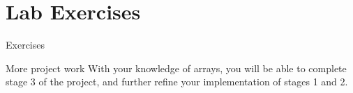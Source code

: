 \documentclass{beamer}
\begin{document}
\section{Lab Exercises}

\begin{frame}{Exercises}
    \begin{block}{More project work}
        With your knowledge of arrays, you will be able to complete stage
        3 of the project, and further refine your implementation of stages
        1 and 2.
    \end{block}
\end{frame}

%
%
\end{document}
